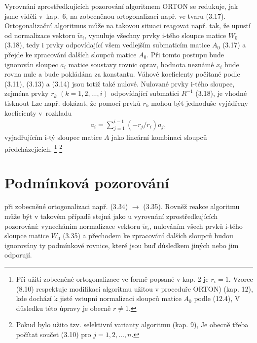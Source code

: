 Vyrovnání zprostředkujících pozorování algoritmem ORTON se
redukuje, jak jsme viděli v~kap.~6, na zobecněnou
ortogonalizaci např. ve tvaru (3.17).
%
%
Ortogonalizační algoritmus může na takovou situaci reagovat např.
tak, že upustí od normalizace vektoru $\widetilde w_i$, vynuluje všechny
prvky i-tého sloupce matice $W_0$ (3.18), tedy i prvky odpovídající
všem vedlejším submaticím matice $A_0$ (3.17) a přejde ke
zpracování dalších sloupců matice $A_0$. Při tomto postupu bude
ignorován sloupec $a_i$ matice soustavy rovnic oprav, hodnota neznámé $x_i$
%
bude  rovna nule a bude pokládána za konstantu. Váhové
koeficlenty počítané podle (3.11), (3.13) a (3.14) jsou totiž také
nulové. Nulované prvky i-tého sloupce, zejména prvky $r_k$ $(k=1,
2,\ldots,i)$ odpovídající submatici $R^{-1}$ (3.18), je vhodné tisknout
Lze např. dokázat, že pomocí prvků $r_k$ mohou být jednoduše
vyjádřeny koeficienty v~rozkladu
%
\begin{align*}
  \tag{8.10}
  a_i = \sum_{j=1}^{i-1} (-r_j/r_i) a_j,
\end{align*}
%
vyjadřujícím i-tý sloupec matice $A$ jako lineární kombinaci
sloupců předcházejících.
%
\footnote{
Při užití zobecněné ortogonalizace ve formě popsané v kap. 2
je $r_i=1$. Vzorec (8.10) respektuje modifikaci algoritmu užitou
v proceduře ORTON) (kap. 12), kde dochází k jisté vstupní
normalizaci sloupců matice $A_0$ podle (12.4), V důsledku této úpravy
je obecně $r \ne 1$.
}
\footnote{
Pokud bylo užito tzv. selektivní varianty algoritmu (kap. 9),
Je obecně třeba počítat součet (3.10) pro $j=1,2,\ldots,n$.
}



\section{Podmínková pozorování}

%
při zobecněné ortogonalizaci
např. (3.34) $\rightarrow$ (3.35). Rovněž reakce algoritmu může být v
takovém případě stejná jako u vyrovnání zprostředkujících pozorování:
vynecháním normalizace vektoru $\widetilde w_i$, nulováním všech
prvků i-tého sloupce matice $W_0$ (3.35) a přechodem ke zpracování
dalších sloupců budou ignorovány ty podmínkové rovnice, které jsou
buď důsledkem jiných nebo jim odporují.


